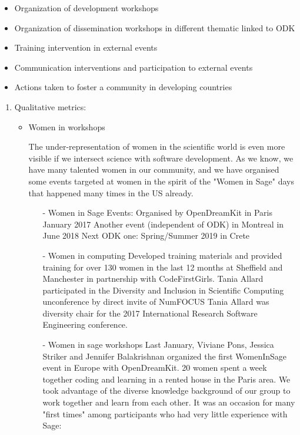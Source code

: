  \begin{itemize}
    \item Organization of development workshops
    \item Organization of dissemination workshops in different thematic linked to ODK
    \item Training intervention in external events
    \item Communication interventions and participation to external events
    \item Actions taken to foster a community in developing countries
    \end{itemize}

\begin{enumerate}
\item Qualitative metrics:
\begin{itemize}
\item Women in \Sage workshops

 The under-representation of women in the scientific world is even more visible if we intersect science with software
  development. As we know, we have many talented women in our community, and we have organised some events targeted at women in the
  spirit of the "Women in Sage" days that happened many times in the US already. %
\begin{itemize}
 \item[-] Women in Sage Events:
    Organised by OpenDreamKit in Paris January 2017
    Another event (independent of ODK) in Montreal in June 2018
    Next ODK one: Spring/Summer 2019 in Crete

 \item[-] Women in computing
    Developed training materials and provided training for over 130 women in the last 12 months at Sheffield and Manchester in partnership 
    with CodeFirstGirls.
    Tania Allard participated in the Diversity and Inclusion in Scientific Computing unconference by direct invite of NumFOCUS
    Tania Allard was diversity chair for the 2017 International Research Software Engineering conference.

 \item[-] Women in sage workshops
    Last January, Viviane Pons, Jessica Striker and Jennifer Balakrishnan organized the first WomenInSage event in Europe with OpenDreamKit.      
    20 women spent a week together coding and learning in a rented house in the Paris area.
    We took advantage of the diverse knowledge background of our group to work together and learn from each other. It was an occasion for 
    many "first times" among participants who had very little experience with Sage:


\end{itemize}
\end{itemize}
\end{enumerate}
